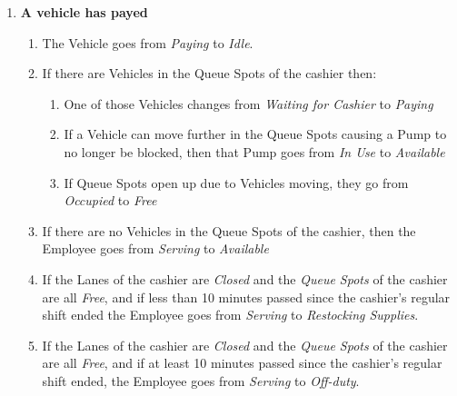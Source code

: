 \begin{enumerate}
	\item \textbf{A vehicle has payed}
	\begin{enumerate}
		\item The Vehicle goes from \textit{Paying} to \textit{Idle}.
		\item If there are Vehicles in the Queue Spots of the cashier then:
		\begin{enumerate}
			\item One of those Vehicles changes from \textit{Waiting for Cashier} to \textit{Paying}
			\item If a Vehicle can move further in the Queue Spots causing a Pump to no longer be blocked, then that Pump goes from \textit{In Use} to \textit{Available}
			\item If Queue Spots open up due to Vehicles moving, they go from \textit{Occupied} to \textit{Free}
		\end{enumerate}
		\item If there are no Vehicles in the Queue Spots of the cashier, then the Employee goes from \textit{Serving} to \textit{Available}
		\item If the Lanes of the cashier are \textit{Closed} and the \textit{Queue Spots} of the cashier are all \textit{Free}, and if less than 10 minutes passed since the cashier's regular shift ended the Employee goes from \textit{Serving} to \textit{Restocking Supplies}.
		\item If the Lanes of the cashier are \textit{Closed} and the \textit{Queue Spots} of the cashier are all \textit{Free}, and if at least 10 minutes passed since the cashier's regular shift ended, the Employee goes from \textit{Serving} to \textit{Off-duty}.
	\end{enumerate}
\end{enumerate}


